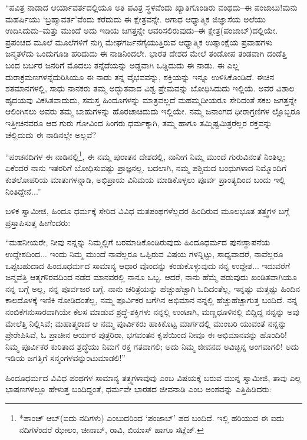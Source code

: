 “ಪವಿತ್ರ ನಾಡಾದ ಆರ್ಯಾವರ್ತದಲ್ಲಿಯೂ ಅತಿ ಪವಿತ್ರ ಸ್ಥಳವೆಂದು ಖ್ಯಾತಿಗೊಂಡಿರು ವಂಥದು–ಈ ಪಂಜಾಬು!ಮನು ಮಹರ್ಷಿಯು ‘ಬ್ರಹ್ಮಾವರ್ತ’ವೆಂದು ಕರೆದುದು ಈ ಕ್ಷೇತ್ರವನ್ನೇ. ಅಗಾಧ ಆಧ್ಯಾತ್ಮಿಕ ಜಿಜ್ಞಾಸೆಯ ಅಲೆಯು ಉದಿಸಿದುದು–ಮತ್ತು ಮುಂದೆ ಅದು ಇಡಿಯ ಜಗತ್ತನ್ನೇ ಆವರಿಸಲಿರುವುದು–ಈ ಕ್ಷೇತ್ರ(ಪಂಜಾಬ್​)ದಲ್ಲಿಯೇ. ಪ್ರಪಂಚದ ಮೂಲೆ ಮೂಲೆಗಳಿಗೆ ನುಗ್ಗಿ ಮೇಘಗರ್ಜನೆಗೈಯುತ್ತಿರುವ ಆಧ್ಯಾತ್ಮಿಕ ಉತ್ಕಾಂಕ್ಷೆಯ ಪ್ರವಾಹಗಳು ಜನ್ಮತಳೆದು ಒಂದುಗೂಡಿ ಹರಿದುದು ಈ ನಾಡಿನಿಂದಲೇ. ಭಾರತ ದೇಶದ ಮೇಲೆ ತಂಡೋಪ ತಂಡವಾಗಿ ದಂಡೆತ್ತಿ ಬಂದ ಬರ್ಬರ ಜನರಿಗೆ ಮೊದಲು ತನ್ನೆದೆಯನ್ನು ಅಡ್ಡವಾಗಿ ಒಡ್ಡಿದುದು ಈ ನಾಡು. ಈ ಎಲ್ಲ ದುರಾಕ್ರಮಣಗಳನ್ನೆದುರಿಸಿಯೂ ಈ ನಾಡು ತನ್ನ ವೈಭವವನ್ನು, ಶಕ್ತಿಯನ್ನು ಇನ್ನೂ ಉಳಿಸಿಕೊಂಡಿದೆ. ಈಚಿನ ಶತಮಾನಗಳಲ್ಲಿ, ಸಾಧು ನಾನಕರು ತಮ್ಮ ಅದ್ಭುತವಾದ ವಿಶ್ವ ಪ್ರೇಮವನ್ನು ಬೋಧಿಸಿದುದು ಇಲ್ಲಿಯೆ. ಅವರ ವಿಶಾಲ ಹೃದಯವು ವಿಕಸಿತವಾದುದು, ಸಮಸ್ತ ಹಿಂದೂಗಳನ್ನು ಮಾತ್ರವಲ್ಲದೆ ಮಹಮ್ಮದೀಯರೂ ಸೇರಿದಂತೆ ಸಕಲ ಜಗತ್ತನ್ನೇ ಆಲಿಂಗಿಸಲು ಅವರು ತಮ್ಮ ಬಾಹುಗಳನ್ನು ಹೊರಚಾಚಿದುದು ಇಲ್ಲಿಯೇ. ನಮ್ಮ ಜನಾಂಗದ ಧೀರಾಗ್ರಣಿಗಳ ಲ್ಲೊಬ್ಬರೂ ಇತ್ತೀಚಿನವರೂ ಆದ ಗುರು ಗೋವಿಂದ ಸಿಂಗರು ಧರ್ಮಕ್ಕಾಗಿ, ತಮ್ಮ ಹಾಗೂ ತಮ್ಮಿಷ್ಟಮಿತ್ರರೆಲ್ಲರ ರಕ್ತವನ್ನು ಚೆಲ್ಲಿದುದು ಈ ನಾಡಿನಲ್ಲೇ ಅಲ್ಲವೆ?

“ಪಂಚನದಿಗಳ ಈ ನಾಡಿನಲ್ಲಿ\footnote{*ಪಾಂಚ್ ಆಬ್​(ಐದು ನದಿಗಳು) ಎಂಬುದರಿಂದ ‘ಪಂಜಾಬ್​’ ಪದ ಬಂದಿದೆ. ಇಲ್ಲಿ ಹರಿಯುವ ಈ ಐದು ನದಿಗಳೆಂದರೆ ಝೇಲಂ, ಚೀನಾಬ್, ರಾವಿ, ಬಿಯಾಸ್ ಹಾಗೂ ಸಟ್ಲೆಜ್.}, ಈ ನಮ್ಮ ಪುರಾತನ ದೇಶದಲ್ಲಿ, ನಾನೀಗ ನಿಮ್ಮ ಮುಂದೆ ಗುರುವಿನಂತೆ ನಿಂತಿಲ್ಲ; ಏಕೆಂದರೆ ನಾನು ಇತರರಿಗೆ ಬೋಧಿಸುವಷ್ಟು ಪ್ರಾಜ್ಞನಲ್ಲ. ಬದಲಾಗಿ, ನಮ್ಮ ಪಶ್ಚಿಮದ ಬಂಧುಗಳಾದ ನಿಮ್ಮೊಂದಿಗೆ ಕುಶಲೋಪರಿಯ ಮಾತುಗಳನ್ನಾಡಿ, ಅಭಿಪ್ರಾಯ ವಿನಿಮಯ ಮಾಡಿಕೊಳ್ಳಲು ಪೂರ್ವ ಪ್ರಾಂತ್ಯದಿಂದ ಬಂದು ಇಲ್ಲಿ ನಿಂತಿದ್ದೇನೆ...”

ಬಳಿಕ ಸ್ವಾಮೀಜಿ, ಹಿಂದೂ ಧರ್ಮಕ್ಕೆ ಸೇರಿದ ವಿವಿಧ ಮತಪಂಥಗಳೆಲ್ಲದರ ಹಿಂದಿರುವ ಮೂಲಭೂತ ತತ್ತ್ವಗಳ ಬಗ್ಗೆ ಪ್ರಸ್ತಾಪಿಸುತ್ತ ಹೀಗೆಂದರು:

“ಮಹನೀಯರೇ, ನೀವು ನನ್ನನ್ನು ನಿಮ್ಮಲ್ಲಿಗೆ ಬರಮಾಡಿಕೊಂಡಿರುವುದು ಹಿಂದೂಧರ್ಮದ ಪುನಃಸ್ಥಾಪನೆಯ ಉದ್ದೇಶದಿಂದ... ಇಂದು ನಿಮ್ಮ ಮುಂದೆ ನಾವೆಲ್ಲರೂ ಒಪ್ಪಿರುವ ವಿಷಯ ಗಳನ್ನಿಟ್ಟು, ಸಾಧ್ಯವಾದರೆ, ನಾವೆಲ್ಲರೂ ಒಪ್ಪಬಹುದಾದ ಹಿಂದೂಧರ್ಮದ ಸಾಮಾನ್ಯ ಆಧಾರ ವೊಂದನ್ನು ಕಂಡುಕೊಳ್ಳುವುದು ನನ್ನ ಉದ್ದೇಶ... ಇದುವರೆಗೆ ಜನ್ಮವೆತ್ತಿ ಆತ್ಮಗೌರವದಿಂದ ನಡೆದ ಮಾನವರಲ್ಲಿ ನಾನೂ ಒಬ್ಬ. ಆದರೆ, ನಾನು ಹೆಮ್ಮೆ ಪಡುವುದು ಖಂಡಿತವಾಗಿಯೂ ನನ್ನ ಬಗ್ಗೆ ಅಲ್ಲ, ನನ್ನ ಪೂರ್ವಜರ ಬಗ್ಗೆ. ನಾನು ಚರಿತ್ರೆಯನ್ನು ಹೆಚ್ಚುಹೆಚ್ಚಾಗಿ ಓದಿದಂತೆಲ್ಲ, ಇನ್ನಷ್ಟು ಮತ್ತಷ್ಟು ಹಿಂದಿನ ಕಾಲದೊಳಕ್ಕೆ ಇಣಿಕಿ ನೋಡಿದಂತೆಲ್ಲ, ನಮ್ಮ ಪೂರ್ವಿಕರ ಬಗೆಗಿನ ಅಭಿಮಾನ ನನ್ನಲ್ಲಿ ಹೆಚ್ಚುಹೆಚ್ಚಾಗುತ್ತ ಬಂದಿದೆ. ನನ್ನ ನಂಬಿಕೆಗನುಸಾರವಾಗಿಯೇ ಕೆಲಸ ಮಾಡುವ ಶ್ರದ್ಧೆ-ಶಕ್ತಿಗಳು ನನ್ನಲ್ಲಿ ಉಂಟಾಗಿ, ಮಣ್ಣಧೂಳಿನಲ್ಲಿ ಬಿದ್ದಿದ್ದ ನನ್ನನ್ನು ಅವು ಮೇಲೆತ್ತಿ ನಿಲ್ಲಿಸಿವೆ; ಮಹಾತ್ಮರಾದ ಆ ನಮ್ಮ ಪೂರ್ವಿಕರು ಹಾಕಿಕೊಟ್ಟ ಮಾರ್ಗದಲ್ಲಿ ಮುಂಬರಿ ಯುವಂತೆ ನನ್ನನ್ನು ಪ್ರೇರೇಪಿಸಿವೆ, ಓ ಪ್ರಾಚೀನ ಆರ್ಯರ ಪುತ್ರರಿರಾ, ಭಗವಂತನ ಕೃಪೆಯಿಂದ ನೀವೂ ಈ ಅಭಿಮಾನವನ್ನು ಹೊಂದಿರಿ! ನಿಮ್ಮ ಪೂರ್ವಿಕರ ಕುರಿತಾದ ಶ್ರದ್ಧೆಯು ನಿಮಗೆ ರಕ್ತ ಗತವಾಗಲಿ; ಅದು ನಿಮ್ಮ ಜೀವನದ ಅವಿಚ್ಛಿನ್ನ ಅಂಗವಾಗಲಿ! ಅದು ಇಡಿಯ ಜಗತ್ತಿಗೆ ಸನ್ಮಂಗಳವನ್ನುಂಟುಮಾಡಲಿ!”

ಹಿಂದೂಧರ್ಮದ ವಿವಿಧ ಪಂಥಗಳ ಸಾಮಾನ್ಯ ತತ್ತ್ವಗಳಾವುವು ಎಂಬ ವಿಷಯಕ್ಕೆ ಬರುವ ಮುನ್ನ ಸ್ವಾಮೀಜಿ, ತಾವು ಎಲ್ಲ ಭಾಷಣಗಳಲ್ಲೂ ಹೇಳುತ್ತ ಬಂದಿದ್ದಂತೆ, ಧರ್ಮವೇ ಭಾರತದ ಜೀವನಾಡಿ ಎಂಬ ಅಂಶವನ್ನು ಎತ್ತಿಹಿಡಿದರು:

